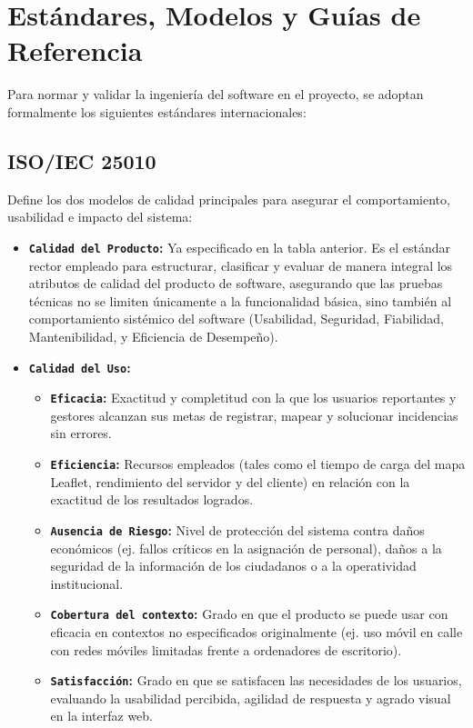 \section{Estándares, Modelos y Guías de Referencia}

Para normar y validar la ingeniería del software en el proyecto, se adoptan formalmente los siguientes estándares internacionales:

\subsection{ISO/IEC 25010}
Define los dos modelos de calidad principales para asegurar el comportamiento, usabilidad e impacto del sistema:
\begin{itemize}
\item \textbf{\texttt{Calidad del Producto}:} Ya especificado en la tabla anterior. Es el estándar rector empleado para estructurar, clasificar y evaluar de manera integral los atributos de calidad del producto de software, asegurando que las pruebas técnicas no se limiten únicamente a la funcionalidad básica, sino también al comportamiento sistémico del software (Usabilidad, Seguridad, Fiabilidad, Mantenibilidad, y Eficiencia de Desempeño).
\item \textbf{\texttt{Calidad del Uso}:}
    \begin{itemize}
        \item \textbf{\texttt{Eficacia}:} Exactitud y completitud con la que los usuarios reportantes y gestores alcanzan sus metas de registrar, mapear y solucionar incidencias sin errores.
        \item \textbf{\texttt{Eficiencia}:} Recursos empleados (tales como el tiempo de carga del mapa Leaflet, rendimiento del servidor y del cliente) en relación con la exactitud de los resultados logrados.
        \item \textbf{\texttt{Ausencia de Riesgo}:} Nivel de protección del sistema contra daños económicos (ej. fallos críticos en la asignación de personal), daños a la seguridad de la información de los ciudadanos o a la operatividad institucional.
        \item \textbf{\texttt{Cobertura del contexto}:} Grado en que el producto se puede usar con eficacia en contextos no especificados originalmente (ej. uso móvil en calle con redes móviles limitadas frente a ordenadores de escritorio).
        \item \textbf{\texttt{Satisfacción}:} Grado en que se satisfacen las necesidades de los usuarios, evaluando la usabilidad percibida, agilidad de respuesta y agrado visual en la interfaz web.
    \end{itemize}
\end{itemize}

